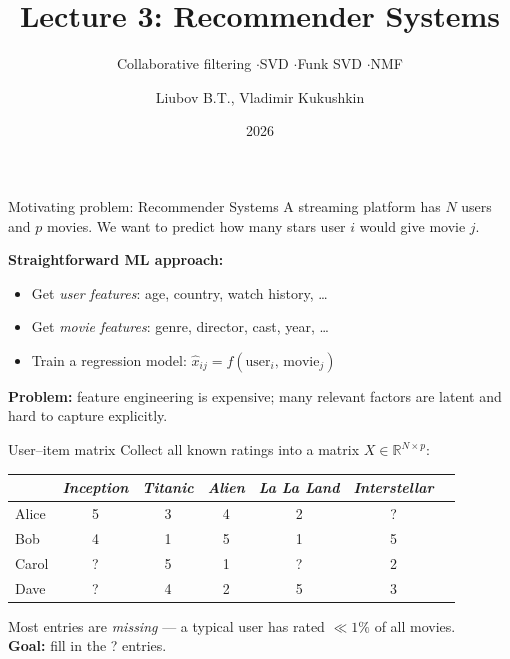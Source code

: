\documentclass[aspectratio=169,t]{beamer}
\title{Lecture 3: Recommender Systems}
\subtitle{Collaborative filtering \enspace$\cdot$\enspace SVD \enspace$\cdot$\enspace Funk SVD \enspace$\cdot$\enspace NMF}
\author{Liubov B.T., Vladimir Kukushkin}
\institute{Constructor University}
\date{2026}
\begin{document}
\maketitle

\begin{frame}{Motivating problem: Recommender Systems}
  A streaming platform has $N$ users and $p$ movies. We want to predict how many stars user $i$ would give movie $j$.

  \vspace{0.3cm}
  \textbf{Straightforward ML approach:}
  \begin{itemize}
    \item Get \emph{user features}: age, country, watch history, \ldots
    \item Get \emph{movie features}: genre, director, cast, year, \ldots
    \item Train a regression model: $\hat{x}_{ij} = f(\text{user}_i,\, \text{movie}_j)$
  \end{itemize}
  \vspace{0.3cm}
  \textbf{Problem:} feature engineering is expensive; many relevant factors are latent and hard to capture explicitly.
\end{frame}


\begin{frame}{User--item matrix}
  Collect all known ratings into a matrix $X \in \mathbb{R}^{N \times p}$:
  \vspace{0.2cm}
  \begin{center}
  \begin{tabular}{lcccccc}
    \toprule
    & \textit{Inception} & \textit{Titanic} & \textit{Alien} & \textit{La La Land} & \textit{Interstellar} \\
    \midrule
    Alice & 5 & 3 & 4 & 2 & \textcolor{accentred}{?} \\
    Bob   & 4 & 1 & 5 & 1 & 5 \\
    Carol & \textcolor{accentred}{?} & 5 & 1 & \textcolor{accentred}{?} & 2 \\
    Dave  & \textcolor{accentred}{?} & 4 & 2 & 5 & 3 \\
    \bottomrule
  \end{tabular}
  \end{center}
  \vspace{0.2cm}
  Most entries are \emph{missing} — a typical user has rated $\ll 1\%$ of all movies.\\[0.2cm]
  \textbf{Goal:} fill in the \textcolor{accentred}{?} entries.
\end{frame}
\end{document}
